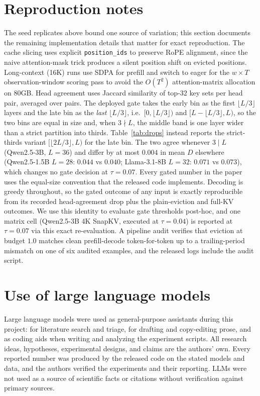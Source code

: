 \section{Reproduction notes}
\label{app:repro}
The seed replicates above bound one source of variation; this section
documents the remaining implementation details that matter for exact
reproduction. The cache slicing uses explicit \texttt{position\_ids} to
preserve RoPE alignment, since the naive attention-mask trick produces a
silent position shift on evicted positions. Long-context (16K) runs use
SDPA for prefill and switch to eager for the $w \times T$
observation-window scoring pass to avoid the $O(T^2)$ attention-matrix
allocation on 80GB. Head agreement uses Jaccard similarity of top-$32$
key sets per head pair, averaged over pairs. The deployed gate takes
the early bin as the first $\lfloor L/3 \rfloor$ layers and the late
bin as the \emph{last} $\lfloor L/3 \rfloor$, i.e.\ $[0, \lfloor L/3
\rfloor)$ and $[L - \lfloor L/3 \rfloor, L)$, so the two bins are
equal in size and, when $3 \nmid L$, the middle band is one layer
wider than a strict partition into thirds. Table~\ref{tab:drops}
instead reports the strict-thirds variant $[\lfloor 2L/3 \rfloor, L)$
for the late bin. The two agree whenever $3 \mid L$ (Qwen2.5-3B, $L =
36$) and differ by at most $0.004$ in mean $D$ elsewhere (Qwen2.5-1.5B
$L = 28$: $0.044$ vs $0.040$; Llama-3.1-8B $L = 32$: $0.071$ vs
$0.073$), which changes no gate decision at $\tau = 0.07$. Every gated
number in the paper uses the equal-size convention that the released
code implements. Decoding is greedy throughout, so the gated outcome
of any input is exactly reproducible from its recorded head-agreement
drop plus the plain-eviction and full-KV outcomes. We use this
identity to evaluate gate thresholds post-hoc, and one matrix cell
(Qwen2.5-3B 4K SnapKV, executed at $\tau = 0.04$) is reported at $\tau
= 0.07$ via this exact re-evaluation. A pipeline audit verifies that
eviction at budget $1.0$ matches clean prefill-decode token-for-token
up to a trailing-period mismatch on one of six audited examples, and
the released logs include the audit script.



\section{Use of large language models}
\label{app:llm}
Large language models were used as general-purpose assistants during this
project: for literature search and triage, for drafting and copy-editing prose,
and as coding aids when writing and analyzing the experiment scripts. All
research ideas, hypotheses, experimental designs, and claims are the authors'
own. Every reported number was produced by the released code on the stated
models and data, and the authors verified the experiments and their reporting.
LLMs were not used as a source of scientific facts or citations without
verification against primary sources.


